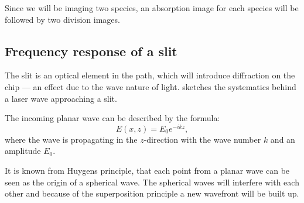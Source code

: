 Since we will be imaging two species, an absorption image for each species will be followed by two division images.

\subsection{Frequency response of a slit}
\label{subsec:slit}

The slit is an optical element in the path, which will introduce diffraction on the chip --- an effect due to the wave nature of light.
 sketches the systematics behind a laser wave approaching a slit.


The incoming planar wave can be described by the formula:
\begin{equation}
E(x,z) = E_0 e^{-ikz},
\end{equation}
where the wave is propagating in the $z$-direction with the wave number $k$ and an amplitude $E_0$.

It is known from Huygens principle, that each point from a planar wave can be seen as the origin of a spherical wave. The spherical waves will interfere with each other and because of the superposition principle a new wavefront will be built up.


